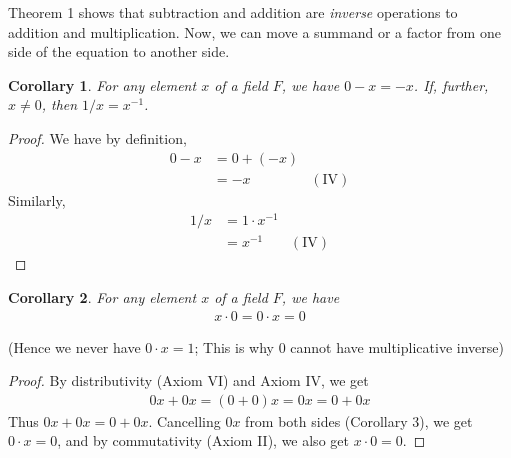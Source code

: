 \documentclass[12pt]{book}
\newtheorem{corollary}{Corollary}
\theoremstyle{definition}
\begin{document}
Theorem 1 shows that subtraction and addition are \textit{inverse} operations to addition and multiplication. Now, we can move a summand or a factor from one side of the equation to another side.
\begin{corollary}
	For any element $x$ of a field $F$, we have $0-x=-x$. If, further, $x\neq 0$, then $1/x=x^{-1}$. 
\end{corollary}
\begin{proof}
We have by definition, 
\begin{align*}
0-x &=0+(-x)\\
&= -x	&(\text{IV})
\end{align*}
Similarly, 
\begin{align*}
1/x &= 1\cdot x^{-1}\\
&= x^{-1} &(\text{IV})	
\end{align*}

\end{proof}
\begin{corollary}
	For any element $x$ of a field $F$, we have
	\begin{align*}
	x\cdot 0 =0\cdot x =0	
	\end{align*}
 
\end{corollary}
\noindent
(Hence we never have $0\cdot x=1$; This is why $0$ cannot have multiplicative inverse)
\begin{proof}
By distributivity (Axiom VI) and Axiom IV, we get
\begin{align*}
	0x+0x=(0+0)x =0x=0+0x	
\end{align*}
Thus $0x+0x=0+0x$. Cancelling $0x$ from both sides (Corollary 3), we get $0\cdot x=0$, and by commutativity (Axiom II), we also get $x\cdot 0=0$.
\end{proof}
\end{document}
